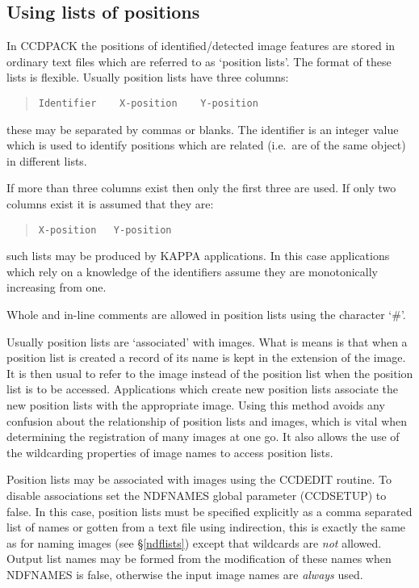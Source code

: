\documentclass[twoside,11pt]{article}
\newcommand{\hyperref}[4]{#2\ref{#4}#3}
\newcommand{\htmlref}[2]{#1}
\newcommand{\xref}[3]{#1}
\newcommand{\xlabel}[1]{}
\renewcommand{\_}{\texttt{\symbol{95}}}
\newenvironment{myquote}{\begin{quote}\begin{small}}{\end{small}\end{quote}}
\newcommand{\routine}[1]{{\sc #1}}
\newcommand{\xroutine}[1]{\htmlref{{\sc #1}}{#1}}
\begin{document}
\subsection{\xlabel{usinglistsofpositions}Using lists of positions
            \label{using_lists_of_positions}}
In CCDPACK the positions of identified/detected image features are
stored in ordinary text files which are referred to as `position lists'.
The format of these lists is flexible. Usually position lists have three
columns:
\begin{myquote}
\begin{verbatim}
Identifier    X-position    Y-position
\end{verbatim}
\end{myquote}
these may be separated by commas or blanks. The identifier is an
integer value which is used to identify positions which are related
(i.e.\ are of the same object) in different lists.

If more than three columns exist then only the first three are used.
If only two columns exist it is assumed that they are:
\begin{myquote}
\begin{verbatim}
X-position   Y-position
\end{verbatim}
\end{myquote}
such lists may be produced by \xref{KAPPA}{sun95}{} applications. In
this case applications which rely on a knowledge of the identifiers
assume they are monotonically increasing from one.

Whole and in-line comments are allowed in position lists using the
character `\#'.

Usually position lists are `associated' with images. What is means is
that when a position list is created a record of its name is kept in the
extension of the image. It is then usual to refer to the image instead of
the position list when the position list is to be accessed. Applications
which create new position lists associate the new position lists with
the appropriate image. Using this method avoids any confusion about the
relationship of position lists and images, which is vital when determining
the registration of many images at one go. It also allows the use of the
wildcarding properties of image names to access position lists.

Position lists may be associated with images using the \routine{CCDEDIT}
routine. To disable associations set the NDFNAMES global parameter
(\xroutine{CCDSETUP}) to false. In this case, position lists must be specified
explicitly as a comma separated list of names or gotten from a text
file using indirection, this is exactly the same as for naming images
(see \hyperref{``processing lists of data''}{\S}{}{ndflists}) except that
wildcards are {\em not} allowed. Output list names may be formed
from the modification of these names when NDFNAMES is false, otherwise
the input image names are {\em always} used.
\end{document}
